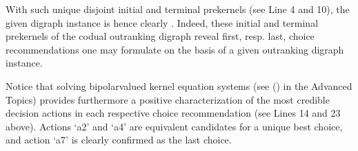 \documentclass[a4paper,12pt,english]{sphinxhowto}
\begin{document}
\sphinxAtStartPar
With such unique disjoint initial and terminal prekernels (see Line 4 and 10), the given digraph instance is hence clearly . Indeed, these initial and terminal prekernels of the codual outranking digraph reveal first, resp. last, choice recommendations one may formulate on the basis of a given outranking digraph instance.

\begin{sphinxVerbatim}[commandchars=\\\{\},numbers=left,firstnumber=1,stepnumber=1]
\end{sphinxVerbatim}

\sphinxAtStartPar
Notice that solving bipolar\sphinxhyphen{}valued kernel equation systems (see {\hyperref[\detokenize{pearls:bipolar-valued-kernels-tutorial-label}]{}} () in the Advanced Topics) provides furthermore a positive characterization of the most credible decision actions in each respective choice recommendation (see Lines 14 and 23 above). Actions ‘a2’ and ‘a4’ are equivalent candidates for a unique best choice, and action ‘a7’ is clearly confirmed as the last choice.
\end{document}
